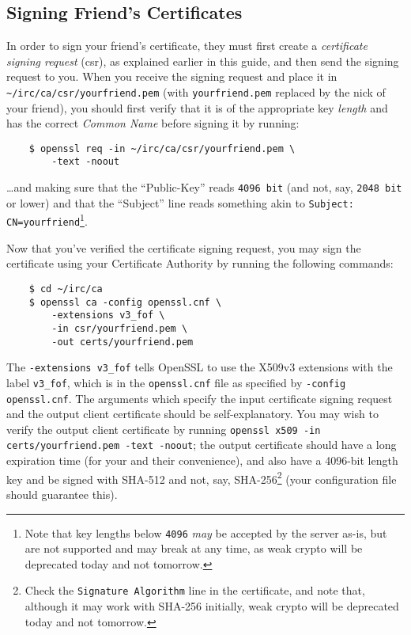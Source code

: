 \documentclass{article}
\begin{document}
{\subsection{Signing Friend's Certificates}
In order to sign your friend's certificate, they must first create a \textit{certificate signing request} (csr), as explained earlier in this guide, and then send the signing request to you.  When you receive the signing request and place it in \texttt{\textasciitilde /irc/ca/csr/yourfriend.pem} (with \texttt{yourfriend.pem} replaced by the nick of your friend), you should first verify that it is of the appropriate key \textit{length} and has the correct \textit{Common Name} before signing it by running:
\begin{lstlisting}
    $ openssl req -in ~/irc/ca/csr/yourfriend.pem \
        -text -noout
\end{lstlisting}
\ldots and making sure that the ``Public-Key'' reads \texttt{4096 bit} (and not, say, \texttt{2048 bit} or lower) and that the ``Subject'' line reads something akin to \texttt{Subject: CN=yourfriend}\footnote{Note that key lengths below \texttt{4096} \textit{may} be accepted by the server as-is, but are not supported and may break at any time, as weak crypto will be deprecated today and not tomorrow.}.

Now that you've verified the certificate signing request, you may sign the certificate using your Certificate Authority by running the following commands:
\begin{lstlisting}
    $ cd ~/irc/ca
    $ openssl ca -config openssl.cnf \
        -extensions v3_fof \
        -in csr/yourfriend.pem \
        -out certs/yourfriend.pem
\end{lstlisting}
The \texttt{-extensions v3\_fof} tells OpenSSL to use the X509v3 extensions with the label \texttt{v3\_fof}, which is in the \texttt{openssl.cnf} file as specified by \texttt{-config openssl.cnf}.  The arguments which specify the input certificate signing request and the output client certificate should be self-explanatory.  You may wish to verify the output client certificate by running \texttt{openssl x509 -in certs/yourfriend.pem -text -noout}; the output certificate should have a long expiration time (for your and their convenience), and also have a 4096-bit length key and be signed with SHA-512 and not, say, SHA-256\footnote{Check the \texttt{Signature Algorithm} line in the certificate, and note that, although it may work with SHA-256 initially, weak crypto will be deprecated today and not tomorrow.} (your configuration file should guarantee this).

}
\end{document}
